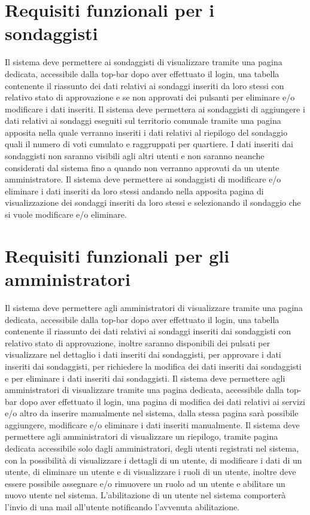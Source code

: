     \section{Requisiti funzionali per i sondaggisti}
        \begin{rfList}
            \rfItem Il sistema deve permettere ai sondaggisti di visualizzare tramite una pagina dedicata, accessibile dalla top-bar dopo aver effettuato il login, una tabella contenente il riassunto dei dati relativi ai sondaggi inseriti da loro stessi con relativo stato di approvazione e se non approvati dei pulsanti per eliminare e/o modificare i dati inseriti. 
            \rfItem Il sistema deve permettera ai sondaggisti di aggiungere i dati relativi ai sondaggi eseguiti sul territorio comunale tramite una pagina apposita nella quale verranno inseriti i dati relativi al riepilogo del sondaggio quali il numero di voti cumulato e raggruppati per quartiere. I dati inseriti dai sondaggisti non saranno visibili agli altri utenti e non saranno neanche considerati dal sistema fino a quando non verranno approvati da un utente amministratore.
            \rfItem Il sistema deve permettere ai sondaggisti di modificare e/o eliminare i dati inseriti da loro stessi andando nella apposita pagina di visualizzazione dei sondaggi inseriti da loro stessi e selezionando il sondaggio che si vuole modificare e/o eliminare. 
        \end{rfList}
    \section{Requisiti funzionali per gli amministratori}
        \begin{rfList}
            \rfItem Il sistema deve permettere agli amministratori di visualizzare tramite una pagina dedicata, accessibile dalla top-bar dopo aver effettuato il login, una tabella contenente il riassunto dei dati relativi ai sondaggi inseriti dai sondaggisti con relativo stato di approvazione, inoltre saranno disponibili dei pulsati per visualizzare nel dettaglio i dati inseriti dai sondaggisti, per approvare i dati inseriti dai sondaggisti, per richiedere la modifica dei dati inseriti dai sondaggisti e per eliminare i dati inseriti dai sondaggisti.
            \rfItem Il sistema deve permettere agli amministratori di visualizzare tramite una pagina dedicata, accessibile dalla top-bar dopo aver effettuato il login, una pagina di modifica dei dati relativi ai servizi e/o altro da inserire manualmente nel sistema, dalla stessa pagina sarà possibile aggiungere, modificare e/o eliminare i dati inseriti manualmente.
            \rfItem Il sistema deve permettere agli amministratori di visualizzare un riepilogo, tramite pagina dedicata accessibile solo dagli amministratori, degli utenti registrati nel sistema, con la possibilità di visualizzare i dettagli di un utente, di modificare i dati di un utente, di eliminare un utente e di visualizzare i ruoli di un utente, inoltre deve essere possibile assegnare e/o rimuovere un ruolo ad un utente e abilitare un nuovo utente nel sistema. L'abilitazione di un utente nel sistema comporterà l'invio di una mail all'utente notificando l'avvenuta abilitazione.
        \end{rfList}